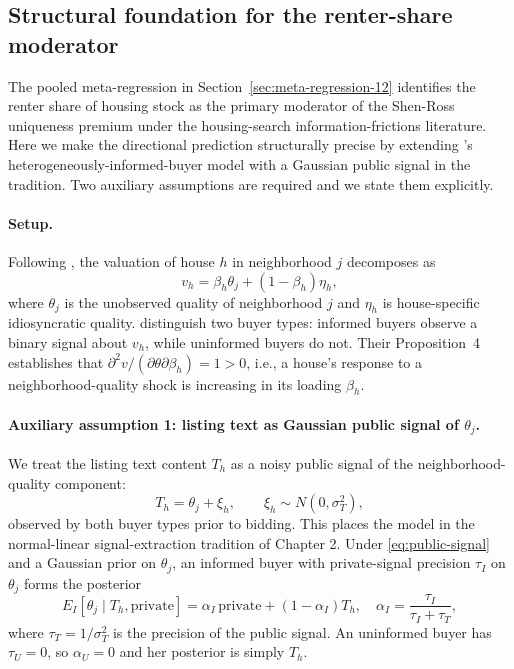 
\subsection{Structural foundation for the renter-share moderator}
\label{sec:structural-renter}

The pooled meta-regression in Section~\ref{sec:meta-regression-12}
identifies the renter share of housing stock as the primary moderator
of the Shen-Ross uniqueness premium under the housing-search
information-frictions literature.  Here we make the directional
prediction structurally precise by extending
\citet{kurlat2015testing}'s heterogeneously-informed-buyer model with
a Gaussian public signal in the \citet{vives2008information} tradition.
Two auxiliary assumptions are required and we state them explicitly.

\paragraph{Setup.} Following \citet{kurlat2015testing}, the valuation
of house $h$ in neighborhood $j$ decomposes as
\begin{equation}
v_h = \beta_h \theta_j + (1 - \beta_h) \eta_h,
\label{eq:ks-decomp}
\end{equation}
where $\theta_j$ is the unobserved quality of neighborhood $j$ and
$\eta_h$ is house-specific idiosyncratic quality.
\citeauthor{kurlat2015testing} distinguish two buyer types: informed
buyers observe a binary signal about $v_h$, while uninformed buyers
do not.  Their Proposition~4 establishes that
$\partial^2 v / (\partial \theta \partial \beta_h) = 1 > 0$, i.e.,
a house's response to a neighborhood-quality shock is increasing in
its loading $\beta_h$.

\paragraph{Auxiliary assumption 1: listing text as Gaussian public
signal of $\theta_j$.}
We treat the listing text content $T_h$ as a noisy public signal of
the neighborhood-quality component:
\begin{equation}
T_h = \theta_j + \xi_h, \qquad \xi_h \sim N(0, \sigma_T^2),
\label{eq:public-signal}
\end{equation}
observed by both buyer types prior to bidding. This places the model
in the normal-linear signal-extraction tradition of
\citet{vives2008information} Chapter 2.  Under
\eqref{eq:public-signal} and a Gaussian prior on $\theta_j$, an
informed buyer with private-signal precision $\tau_I$ on $\theta_j$
forms the posterior
\begin{equation}
E_I[\theta_j \mid T_h, \text{private}] = \alpha_I \, \text{private}
+ (1 - \alpha_I) T_h,
\quad
\alpha_I = \frac{\tau_I}{\tau_I + \tau_T},
\label{eq:posterior-informed}
\end{equation}
where $\tau_T = 1/\sigma_T^2$ is the precision of the public signal.
An uninformed buyer has $\tau_U = 0$, so $\alpha_U = 0$ and her
posterior is simply $T_h$.

